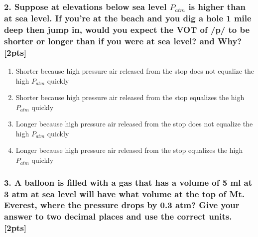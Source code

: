\documentclass[
  12pt,
]{article}
\providecommand{\tightlist}{%
  \setlength{\itemsep}{0pt}\setlength{\parskip}{0pt}}
\begin{document}
\hypertarget{suppose-at-elevations-below-sea-level-p_atm-is-higher-than-at-sea-level.-if-youre-at-the-beach-and-you-dig-a-hole-1-mile-deep-then-jump-in-would-you-expect-the-vot-of-p-to-be-shorter-or-longer-than-if-you-were-at-sea-level-and-why-2pts}{%
\subsubsection{\texorpdfstring{2. Suppose at elevations below sea level
\(P_{atm}\) is higher than at sea level. If you're at the beach and you
dig a hole 1 mile deep then jump in, would you expect the VOT of /p/ to
be shorter or longer than if you were at sea level? and Why?
{[}2pts{]}}{2. Suppose at elevations below sea level P\_\{atm\} is higher than at sea level. If you're at the beach and you dig a hole 1 mile deep then jump in, would you expect the VOT of /p/ to be shorter or longer than if you were at sea level? and Why? {[}2pts{]}}}\label{suppose-at-elevations-below-sea-level-p_atm-is-higher-than-at-sea-level.-if-youre-at-the-beach-and-you-dig-a-hole-1-mile-deep-then-jump-in-would-you-expect-the-vot-of-p-to-be-shorter-or-longer-than-if-you-were-at-sea-level-and-why-2pts}}

\begin{enumerate}
\def\labelenumi{\alph{enumi}.}
\tightlist
\item
  Shorter because high pressure air released from the stop does not
  equalize the high \(P_{atm}\) quickly
\item
  Shorter because high pressure air released from the stop equalizes the
  high \(P_{atm}\) quickly
\item
  Longer because high pressure air released from the stop does not
  equalize the high \(P_{atm}\) quickly
\item
  Longer because high pressure air released from the stop equalizes the
  high \(P_{atm}\) quickly
\end{enumerate}

\hypertarget{a-balloon-is-filled-with-a-gas-that-has-a-volume-of-5-ml-at-3-atm-at-sea-level-will-have-what-volume-at-the-top-of-mt.-everest-where-the-pressure-drops-by-0.3-atm-give-your-answer-to-two-decimal-places-and-use-the-correct-units.-2pts}{%
\subsubsection{3. A balloon is filled with a gas that has a volume of 5
ml at 3 atm at sea level will have what volume at the top of Mt.
Everest, where the pressure drops by 0.3 atm? Give your answer to two
decimal places and use the correct units.
{[}2pts{]}}\label{a-balloon-is-filled-with-a-gas-that-has-a-volume-of-5-ml-at-3-atm-at-sea-level-will-have-what-volume-at-the-top-of-mt.-everest-where-the-pressure-drops-by-0.3-atm-give-your-answer-to-two-decimal-places-and-use-the-correct-units.-2pts}}
\end{document}
